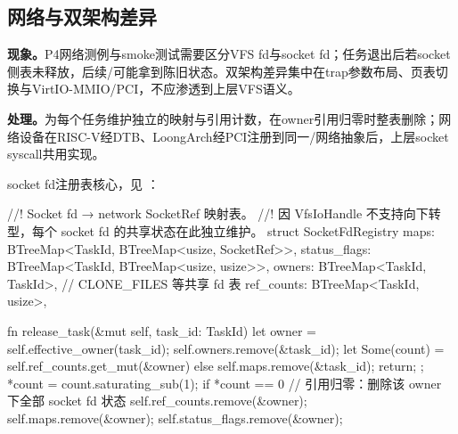 \subsection{网络与双架构差异}

\textbf{现象。}P4网络测例与smoke测试需要区分VFS fd与socket fd；任务退出后若socket侧表未释放，后续/可能拿到陈旧状态。双架构差异集中在trap参数布局、页表切换与VirtIO-MMIO/PCI，不应渗透到上层VFS语义。

\textbf{处理。}为每个任务维护独立的映射与引用计数，在owner引用归零时整表删除；网络设备在RISC-V经DTB、LoongArch经PCI注册到同一/网络抽象后，上层socket syscall共用实现。

socket fd注册表核心，见 ：

\begin{rustcode}
//! Socket fd → network SocketRef 映射表。
//! 因 VfsIoHandle 不支持向下转型，每个 socket fd 的共享状态在此独立维护。
struct SocketFdRegistry {
    maps: BTreeMap<TaskId, BTreeMap<usize, SocketRef>>,
    status_flags: BTreeMap<TaskId, BTreeMap<usize, usize>>,
    owners: BTreeMap<TaskId, TaskId>,      // CLONE_FILES 等共享 fd 表
    ref_counts: BTreeMap<TaskId, usize>,
}

fn release_task(&mut self, task_id: TaskId) {
    let owner = self.effective_owner(task_id);
    self.owners.remove(&task_id);
    let Some(count) = self.ref_counts.get_mut(&owner) else {
        self.maps.remove(&task_id);
        return;
    };
    *count = count.saturating_sub(1);
    if *count == 0 {
        // 引用归零：删除该 owner 下全部 socket fd 状态
        self.ref_counts.remove(&owner);
        self.maps.remove(&owner);
        self.status_flags.remove(&owner);
    }
}
\end{rustcode}